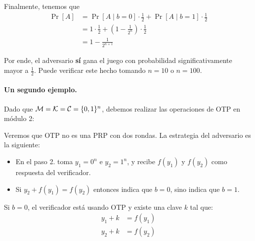Finalmente, tenemos que
\begin{align*}
    \Pr[A] & = \Pr[A \mid b = 0] \cdot \frac{1}{2} + \Pr[A \mid b = 1] \cdot \frac{1}{2} \\
           & = 1 \cdot \frac{1}{2} + \left(1 - \frac{1}{2^n}\right) \cdot \frac{1}{2}    \\
           & = 1 - \frac{1}{2^{n+1}}
\end{align*}

Por ende, el adversario \textbf{sí} gana el juego con probabilidad significativamente mayor a $\frac{1}{2}$. Puede verificar este hecho tomando $n = 10$ o $n = 100$.

\paragraph{Un segundo ejemplo.} Dado que $\mathcal{M} = \mathcal{K} = \mathcal{C} = \{0,1\}^n$, debemos realizar las operaciones de OTP en módulo 2:

Veremos que OTP no es una PRP con dos rondas. La estrategia del adversario es la siguiente:
\begin{itemize}
    \item En el paso 2. toma $y_1 = 0^n$ e $y_2 = 1^n$, y recibe $f(y_1)$ y $f(y_2)$ como respuesta del verificador.
    \item Si $y_2 + f(y_1) = f(y_2)$ entonces indica que $b = 0$, sino indica que $b = 1$.
\end{itemize}

Si $b = 0$, el verificador está usando OTP y existe una clave $k$ tal que:
\begin{align*}
    y_1 + k & = f(y_1) \\
    y_2 + k & = f(y_2)
\end{align*}

